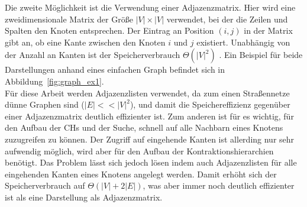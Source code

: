 Die zweite Möglichkeit ist die Verwendung einer Adjazenzmatrix. Hier wird eine zweidimensionale
Matrix der Größe $|V| \times |V|$ verwendet, bei der die Zeilen und Spalten den Knoten entsprechen.
Der Eintrag an Position $(i,j)$ in der Matrix gibt an, ob eine Kante zwischen den Knoten $i$ und $j$
existiert. Unabhängig von der Anzahl an Kanten ist der Speicherverbrauch $\Theta(|V|^2)$
\cite{intro.algo}. Ein Beispiel für beide Darstellungen anhand eines einfachen Graph befindet sich
in Abbildung~\ref{fig:graph_ex1}.\\

Für diese Arbeit werden Adjazenzlisten verwendet, da zum einen Straßennetze dünne Graphen sind ($|E|
    << |V|^2$), und damit die Speichereffizienz gegenüber einer Adjazenzmatrix deutlich effizienter
ist. Zum anderen ist für es wichtig, für den Aufbau der \ac{CHs} und der Suche, schnell auf alle
Nachbarn eines Knotens zuzugreifen zu können. Der Zugriff auf
eingehende Kanten ist allerding nur sehr aufwendig  möglich, wird  aber für den Aufbau der
Kontraktionshierarchien benötigt. Das Problem lässt sich jedoch lösen indem auch
Adjazenzlisten für alle eingehenden Kanten eines Knotens angelegt werden. Damit erhöht sich der
Speicherverbrauch auf $\Theta(|V| + 2|E|)$, was aber immer noch deutlich effizienter ist als
eine Darstellung als Adjazenzmatrix.%

